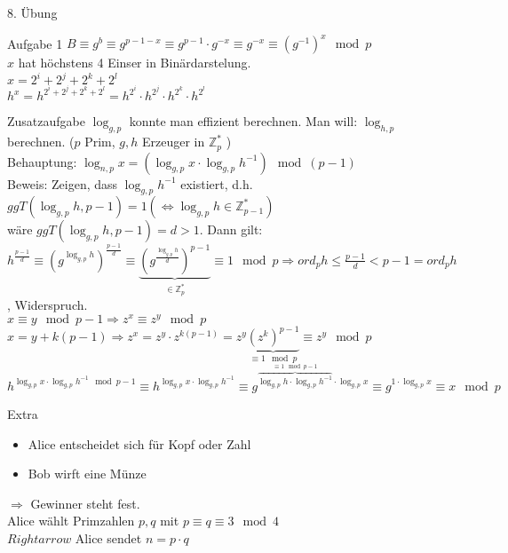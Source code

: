 \begin{section}{8. Übung}
 \begin{subsection}{Aufgabe 1}
  $B \equiv g^b \equiv g^{p-1-x} \equiv g^{p-1}\cdot g^{-x} \equiv g^{-x} \equiv (g^{-1})^x \mod p$\\
  $x$ hat höchstens 4 Einser in Binärdarstelung. \\
  $x=2^i+2^j+2^k+2^l$\\
  $h^x = h^{2^i+2^j+2^k+2^l} = h^{2^i} \cdot h^{2^j} \cdot h^{2^k} \cdot h^{2^l}$
 \end{subsection}
 \begin{subsection}{Zusatzaufgabe}
  $\log_{g,p}$ konnte man effizient berechnen. Man will: $\log_{h,p}$ berechnen. ($p$ Prim, $g,h$ Erzeuger in $\mathbb{Z}_p^*$ )\\
  Behauptung:  $\log_{n,p} x= (\log_{g,p} x \cdot \log_{g,p} h ^{-1}) \mod (p-1)$\\
  Beweis: Zeigen, dass $\log_{g,p} h ^{-1}$ existiert, d.h. \\
  $ggT(\log_{g,p} h, p-1) = 1 (\Leftrightarrow \log_{g,p} h \in \mathbb{Z}_{p-1}^*)$\\
  wäre $ggT(\log_{g,p} h, p-1) = d > 1$. Dann gilt: $h^{\frac{p-1}{d}} \equiv (g^{\log_{g,p} h})^{\frac{p-1}{d}} \equiv \underbrace{(g^{\frac{\log_{g,p} h}{d}})^{p-1}}_{\in \mathbb{Z}_p^*} \equiv 1 \mod p \Rightarrow ord_p h \leq \frac{p-1}{d}<p-1 = ord_p h$, Widerspruch.\\
  $x \equiv y \mod p-1 \Rightarrow z^x \equiv z^y \mod p$\\
  $x = y +k(p-1) \Rightarrow z^x = z^y\cdot z^{k(p-1)} = z^y \underbrace{(z^k)^{p-1}}_{\equiv 1 \mod p} \equiv z^y \mod p $\\
  $h^{\log_{g,p} x \cdot \log_{g,p} h ^{-1} \mod p-1} \equiv h^{\log_{g,p} x \cdot \log_{g,p} h ^{-1}} \equiv g^{\overbrace{\log_{g,p} h \cdot \log_{g,p} h ^{-1}}^{\equiv 1 \mod p-1}\cdot \log_{g,p} x} \equiv g^{1\cdot \log_{g,p} x} \equiv x \mod p$
 \end{subsection}
 \begin{subsection}{Extra}
  \begin{itemize}
   \item Alice entscheidet sich für Kopf oder Zahl
   \item Bob wirft eine Münze
  \end{itemize}
  $\Rightarrow$ Gewinner steht fest.\\
  Alice wählt Primzahlen $p,q$ mit $p\equiv q \equiv 3 \mod 4$\\
  $Rightarrow$ Alice sendet $n=p\cdot q$\\

\end{subsection}
\end{section}
